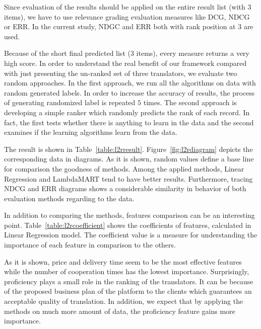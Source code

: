 Since evaluation of the results should be applied on  the entire result list (with $3$ items), we have to use relevance grading evaluation measures like DCG, NDCG or ERR. In the current study, NDGC and ERR both with rank position at $3$ are used.

Because of the short final predicted list ($3$ items), every  measure returns a very high score. In order to understand the real benefit of our framework compared with just presenting the un-ranked set of three translators, we evaluate two random approaches. In the first approach, we run all the algorithms on data with random generated labels. In order to increase the accuracy of results, the process of generating randomized label is repeated $5$ times. The second approach is developing a simple ranker which randomly predicts the rank of each record. In fact, the first tests whether there is anything to learn in the data and the second examines if the learning algorithms learn from the data.

The result is shown in Table~\ref{table:l2rresult}.  Figure~\ref{fig:l2rdiagram} depicts the corresponding data in diagrams. As it is shown, random values define a base line for comparison the goodness of methods. Among the applied methods, Linear Regression and LambdaMART tend to have better results. Furthermore, tracing NDCG and ERR diagrams shows a considerable similarity in behavior of both evaluation methods regarding to the data.

In addition to comparing the methods, features comparison can be an interesting point. Table~\ref{table:l2rcoefficient} shows the coefficients of features, calculated in Linear Regression model. The coefficient value is a measure for understanding the importance of each feature in comparison to the others. 

As it is shown, price and delivery time seem to be the most effective features while the number of cooperation times has the lowest importance. Surprisingly, proficiency plays a small role in the ranking of the translators. It can be because of the proposed business plan of the platform to the clients which guarantees an acceptable quality of translation. In addition, we expect that by applying the methods on much more amount of data, the proficiency feature gains more importance.

